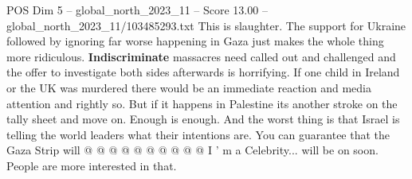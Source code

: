 \begin{textsample}{POS Dim 5 – global\_north\_2023\_11 – Score 13.00 – global\_north\_2023\_11/103485293.txt}
This is slaughter.
The support for Ukraine followed by ignoring far worse happening in Gaza just makes the whole thing more ridiculous. \textbf{Indiscriminate} massacres need called out and challenged and the offer to investigate both sides afterwards is horrifying.
If one child in Ireland or the UK was murdered there would be an immediate reaction and media attention and rightly so.
But if it happens in Palestine its another stroke on the tally sheet and move on.
Enough is enough.
And the worst thing is that Israel is telling the world leaders what their intentions are.
You can guarantee that the Gaza Strip will @ @ @ @ @ @ @ @ @ @ I ' m a Celebrity... will be on soon.
People are more interested in that.

\end{textsample}
